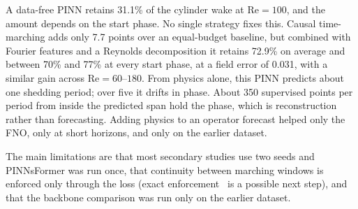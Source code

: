 \documentclass[conference]{IEEEtran}
\newcommand{\Rey}{\mathrm{Re}}
\begin{document}
A data-free PINN retains 31.1\% of the cylinder wake at $\Rey = 100$, and the
amount depends on the start phase. No single strategy fixes this. Causal
time-marching adds only 7.7 points over an equal-budget baseline, but combined
with Fourier features and a Reynolds decomposition it retains 72.9\% on
average and between 70\% and 77\% at every start phase, at a field error of
0.031, with a similar gain across $\Rey = 60$--$180$. From physics alone, this
PINN predicts about one shedding period; over five it drifts in phase. About
350 supervised points per period from inside the predicted span hold the
phase, which is reconstruction rather than forecasting. Adding physics to an
operator forecast helped only the FNO, only at short horizons, and only on the
earlier dataset.

The main limitations are that most secondary studies use two seeds and
PINNsFormer was run once, that continuity between marching windows is enforced
only through the loss (exact enforcement~\cite{roy2024} is a possible next
step), and that the backbone comparison was run only on the earlier dataset.
\end{document}
